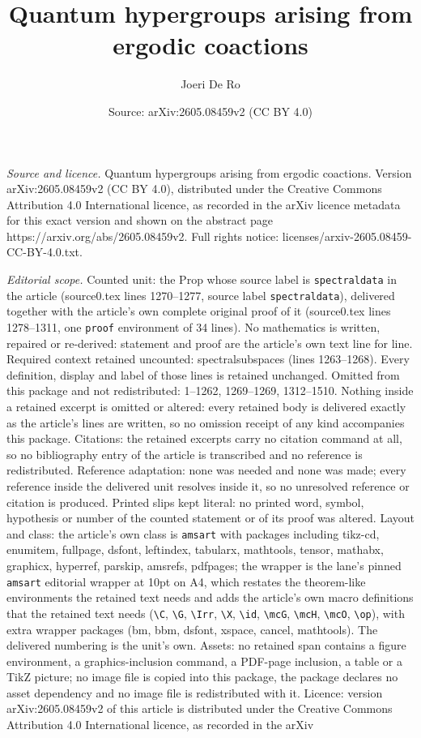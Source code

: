 \documentclass[10pt,a4paper]{amsart}
\title[Quantum hypergroups arising from ergodic coactions]{Quantum hypergroups arising from ergodic coactions}
\author{Joeri De Ro}
\date{Source: arXiv:2605.08459v2 (CC BY 4.0)}
\begin{document}
\maketitle

\noindent\emph{Source and licence.} Quantum hypergroups arising from ergodic coactions. Version arXiv:2605.08459v2 (CC BY 4.0), distributed under the Creative Commons Attribution 4.0 International licence, as recorded in the arXiv licence metadata for this exact version and shown on the abstract page https://arxiv.org/abs/2605.08459v2. Full rights notice: licenses/arxiv-2605.08459-CC-BY-4.0.txt.\par\smallskip

\noindent\textit{Editorial scope.} Counted unit: the Prop whose source label is \texttt{spectraldata} in the article (source0.tex lines 1270--1277, source label \texttt{spectraldata}), delivered together with the article's own complete original proof of it (source0.tex lines 1278--1311, one \texttt{proof} environment of 34 lines). No mathematics is written, repaired or re-derived: statement and proof are the article's own text line for line. Required context retained uncounted: spectralsubspaces (lines 1263--1268). Every definition, display and label of those lines is retained unchanged. Omitted from this package and not redistributed: 1--1262, 1269--1269, 1312--1510. Nothing inside a retained excerpt is omitted or altered: every retained body is delivered exactly as the article's lines are written, so no omission receipt of any kind accompanies this package. Citations: the retained excerpts carry no citation command at all, so no bibliography entry of the article is transcribed and no reference is redistributed. Reference adaptation: none was needed and none was made; every reference inside the delivered unit resolves inside it, so no unresolved reference or citation is produced. Printed slips kept literal: no printed word, symbol, hypothesis or number of the counted statement or of its proof was altered. Layout and class: the article's own class is \texttt{amsart} with packages including tikz-cd, enumitem, fullpage, dsfont, leftindex, tabularx, mathtools, tensor, mathabx, graphicx, hyperref, parskip, amsrefs, pdfpages; the wrapper is the lane's pinned \texttt{amsart} editorial wrapper at 10pt on A4, which restates the theorem-like environments the retained text needs and adds the article's own macro definitions that the retained text needs (\texttt{\textbackslash C}, \texttt{\textbackslash G}, \texttt{\textbackslash Irr}, \texttt{\textbackslash X}, \texttt{\textbackslash id}, \texttt{\textbackslash mcG}, \texttt{\textbackslash mcH}, \texttt{\textbackslash mcO}, \texttt{\textbackslash op}), with extra wrapper packages (bm, bbm, dsfont, xspace, cancel, mathtools). The delivered numbering is the unit's own. Assets: no retained span contains a figure environment, a graphics-inclusion command, a PDF-page inclusion, a table or a TikZ picture; no image file is copied into this package, the package declares no asset dependency and no image file is redistributed with it. Licence: version arXiv:2605.08459v2 of this article is distributed under the Creative Commons Attribution 4.0 International licence, as recorded in the arXiv 
\end{document}
